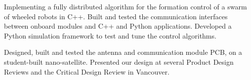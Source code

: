 \documentclass{ResumeTemplate}
\begin{document}
	\workitemsthree
	{Implementing a fully distributed algorithm for the formation control of a swarm of wheeled robots in C++.}
	{Built and tested the communication interfaces between onboard modules and C++ and Python applications.}
	{Developed a Python simulation framework to test and tune the control algorithms. }
	

	

	\workitemstwo
	{Designed, built and tested the antenna and communication module PCB, on a student-built nano-satellite.}
	{Presented our design at several Product Design Reviews and the Critical Design Review in Vancouver.}

	
\end{document}
